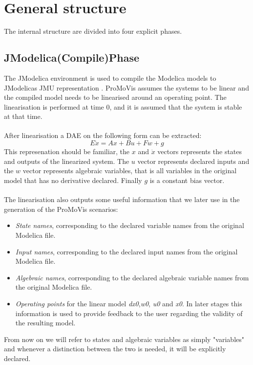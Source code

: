 \section{General structure}
The internal structure are divided into four explicit phases. 
\subsection{JModelica(Compile)Phase}
The JModelica environment is used to compile the Modelica models to JModelicas JMU representation \cite{jmodelicaorg}\nocite{*}. ProMoVis assumes the systems to be linear and the compiled model needs to be linearised around an operating point. The linearisation is performed at time 0, and it is assumed that the system is stable at that time.\\\\After linearisation a DAE on the following form can be extracted:%
\begin{equation}
E\dot{x} = Ax + Bu + Fw + g
\end{equation}%
This represenation should be familiar, the $x$ and $\dot{x}$  vectors represents the states and outputs of the linearized system. The $u$ vector represents declared inputs and the $w$ vector represents algebraic variables, that is all variables in the original model that has no derivative declared. Finally $g$ is a constant bias vector.\\\\The linearisation also outputs some useful information that we later use in the generation of the ProMoVis scenarios:
\begin{itemize}
\item \textit{State names}, corresponding to the declared variable names from the original Modelica file.
\item \textit{Input names}, corresponding to the declared input names from the original Modelica file.
\item \textit{Algebraic names}, corresponding to the declared algebraic variable names from the original Modelica file.
\item \textit{Operating points} for the linear model \textit{dx0},\textit{w0}, \textit{u0} and \textit{x0}. In later stages this information is used to provide feedback to the user regarding the validity of the resulting model.
\end{itemize}
From now on we will refer to states and algebraic variables as simply "variables" and whenever a distinction between the two is needed, it will be explicitly declared.%
